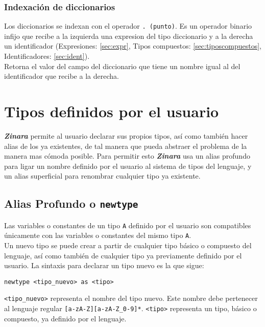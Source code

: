 \documentclass[12pt, spanish]{report}
\begin{document}
\subsubsection{Indexaci\'on de diccionarios}
\label{sec:index_dict}
Los diccionarios se indexan con el operador \texttt{. (punto)}. Es un operador
binario infijo que recibe a la izquierda una expresion del tipo
diccionario y a la derecha un identificador (Expresiones: \ref{sec:expr}, 
Tipos compuestos: \ref{sec:tiposcompuestos}, Identificadores: \ref{sec:ident}).\\
\indent Retorna el valor del campo del diccionario que tiene un nombre
igual al del identificador que recibe a la derecha.

\section{Tipos definidos por el usuario}
\label{sec:tiposusuario}
\emph{\textbf{Zinara}} permite al usuario declarar sus propios tipos,
así como también hacer alias de los ya existentes, de tal manera que
pueda abstraer el problema de la manera mas c\'omoda posible. Para
permitir esto \emph{\textbf{Zinara}} usa un alias profundo para ligar
un nombre definido por el usuario al sistema de tipos del lenguaje, y
un alias superficial para renombrar cualquier tipo ya existente.

\subsection{Alias Profundo o \texttt{newtype}}
\label{sec:tiposusuario:newtype}
Las variables o constantes de un tipo \texttt{A} definido por el
usuario son compatibles \'unicamente con las variables o constantes
del mismo tipo \texttt{A}.\\
\indent Un nuevo tipo se puede crear a partir de cualquier tipo
b\'asico o compuesto del lenguaje, así como también de cualquier tipo
ya previamente definido por el usuario. La sintaxis para declarar un
tipo nuevo es la que sigue:

\begin{verbatim}
newtype <tipo_nuevo> as <tipo>
\end{verbatim}

\texttt{\textless tipo\_nuevo\textgreater} representa el nombre del
tipo nuevo. Este nombre debe pertenecer al lenguaje regular
\texttt{[a-zA-Z][a-zA-Z\_0-9]*}. \texttt{\textless tipo\textgreater}
representa un tipo, b\'asico o compuesto, ya definido por el lenguaje.\\
\end{document}
